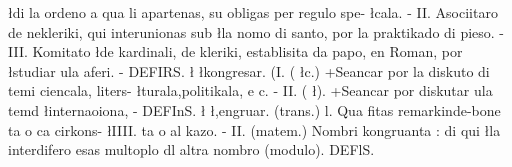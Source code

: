 {\l{di la ordeno a qua li apartenas, su obligas per regulo spe-}
\l{cala. - II. Asociitaro de nekleriki, qui interunionas sub}
\l{la nomo di santo, por la praktikado di pieso. - III. Komitato}
\l{de kardinali, de kleriki, establisita da papo, en Roman, por}
\l{studiar ula aferi. - DEFIRS.}
\l{}
\l{kongresar. (I. (}
\l{c.) +Seancar por la diskuto di temi ciencala, liters-}
\l{turala,politikala, e c. - II. (}
\l{). +Seancar por diskutar ula temd}
\l{internaoiona, - DEFInS.}
\l{}
\l{,engruar. (trans.) l. Qua fitas remarkinde-bone ta o ca cirkons-}
\l{IIII. ta o al kazo. - II. (matem.) Nombri kongruanta : di qui}
\l{la interdifero esas multoplo dl altra nombro (modulo). DEFlS.}
}
